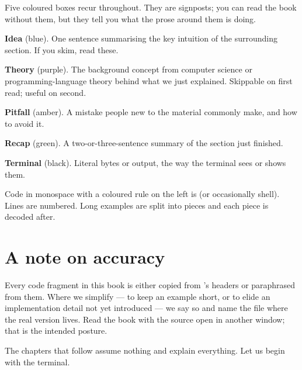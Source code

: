 \documentclass[11pt,openany,oneside]{book}
\begin{document}
Five coloured boxes recur throughout. They are signposts; you can
read the book without them, but they tell you what the prose around
them is doing.

\begin{idea}
\textbf{Idea} (blue). One sentence summarising the key intuition of
the surrounding section. If you skim, read these.
\end{idea}

\begin{theory}
\textbf{Theory} (purple). The background concept from computer
science or programming-language theory behind what we just
explained. Skippable on first read; useful on second.
\end{theory}

\begin{warning}
\textbf{Pitfall} (amber). A mistake people new to the material
commonly make, and how to avoid it.
\end{warning}

\begin{recap}
\textbf{Recap} (green). A two-or-three-sentence summary of the
section just finished.
\end{recap}

\begin{terminalbox}
\textbf{Terminal} (black). Literal bytes or output, the way the
terminal sees or shows them.
\end{terminalbox}

Code in monospace with a coloured rule on the left is \cpp{} (or
occasionally shell). Lines are numbered. Long examples are split
into pieces and each piece is decoded after.

\section*{A note on accuracy}

Every code fragment in this book is either copied from \maya{}'s
headers or paraphrased from them. Where we simplify --- to keep an
example short, or to elide an implementation detail not yet
introduced --- we say so and name the file where the real version
lives. Read the book with the source open in another window;
that is the intended posture.

\bigskip

\noindent The chapters that follow assume nothing and explain
everything. Let us begin with the terminal.

\clearpage

\tableofcontents
\end{document}

